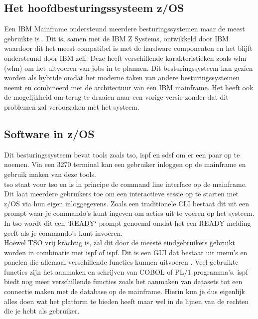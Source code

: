 \subsection{Het hoofdbesturingssysteem z/OS}
Een IBM Mainframe ondersteund meerdere besturingssystemen maar de meest gebruikte is . Dit is, samen met de IBM Z Systems, ontwikkeld door IBM waardoor dit het meest compatibel is met de hardware componenten en het blijft ondersteund door IBM zelf. Deze heeft verschillende karakteristieken zoals \acrlong{wlm} (\acrshort{wlm}) om het uitvoeren van jobs in te plannen. Dit besturingssysteem kan gezien worden als hybride omdat het moderne taken van andere besturingssystemen neemt en combineerd met de architectuur van een IBM mainframe. Het heeft ook de mogelijkheid om terug te draaien naar een vorige versie zonder dat dit problemen zal veroorzaken met het systeem. \autocite{Rupp2022} 

\subsection{Software in z/OS}
Dit besturingssysteem bevat tools zoals \acrshort{tso}, \acrshort{ispf} en \acrshort{sdsf} om er een paar op te noemen. Via een 3270 terminal kan een gebruiker inloggen op de mainframe en gebruik maken van deze tools. \\

\acrlong{tso} staat voor \acrlong{tso} en is in principe de command line interface op de mainframe. Dit laat meerdere gebruikers toe om een interactieve sessie op te starten met z/OS via hun eigen inloggegevens. Zoals een traditionele CLI bestaat dit uit een prompt waar je commando's kunt ingeven om acties uit te voeren op het systeem. In \acrlong{tso} wordt dit een `READY` prompt genoemd omdat het een READY melding geeft als je commando's kunt invoeren. \autocite{IBM} \\

Hoewel TSO vrij krachtig is, zal dit door de meeste eindgebruikers gebruikt worden in combinatie met \acrshort{ispf} of \acrlong{ispf}. Dit is een GUI dat bestaat uit menu's en panelen die allemaal verschillende functies kunnen uitvoeren \autocite{IBM}. Veel gebruikte functies zijn het aanmaken en schrijven van COBOL of PL/1 programma's. \acrshort{ispf} biedt nog meer verschillende functies zoals het aanmaken van datasets tot een connectie maken met de database op de mainframe. Hierin kun je dus eigenlijk alles doen wat het platform te bieden heeft maar wel in de lijnen van de rechten die je hebt als gebruiker. \autocite{IBM} \\

